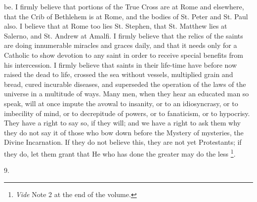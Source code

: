 be. I firmly believe that portions of the True Cross are
at Rome and elsewhere, that the Crib of Bethlehem is at
Rome, and the bodies of St. Peter and St. Paul also. I
believe that at Rome too lies St. Stephen, that St.
Matthew lies at Salerno, and St. Andrew at Amalfi. I
firmly believe that the relics of the saints are doing
innumerable miracles and graces daily, and that it needs
only for a Catholic to show devotion to any saint in
order to receive special benefits from his intercession.
I firmly believe that saints in their life-time have
before now raised the dead to life, crossed the sea
without vessels, multiplied grain and bread, cured
incurable diseases, and superseded the operation of the
laws of the universe in a multitude of ways. Many men,
when they hear an educated man so speak, will at once
impute the avowal to insanity, or to an idiosyncrasy, or
to imbecility of mind, or to decrepitude of powers, or to
fanaticism, or to hypocrisy. They have a right to say so,
if they will; and we have a right to ask them why they do
not say it of those who bow down before the Mystery of
mysteries, the Divine Incarnation. If they do not believe
this, they are not yet Protestants; if they do, let them
grant that He who has done the greater may do the less \footnote{\emph{Vide} Note 2 at the end
of the volume.}.

9.

